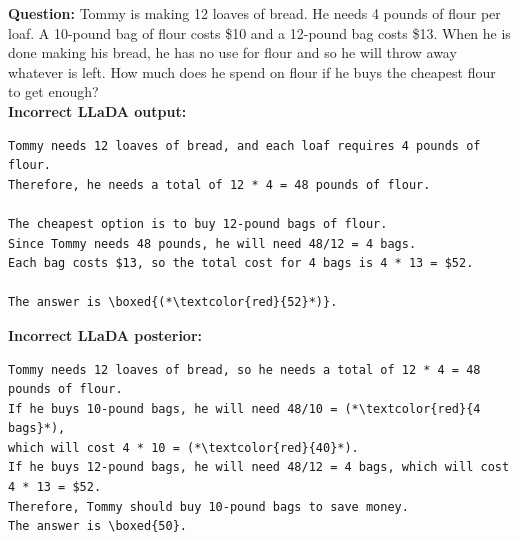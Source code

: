 \begin{examplebox}[Example 1]
\textbf{Question:} Tommy is making 12 loaves of bread. He needs 4 pounds of flour per loaf. A 10-pound bag of flour costs \$10 and a 12-pound bag costs \$13. When he is done making his bread, he has no use for flour and so he will throw away whatever is left. How much does he spend on flour if he buys the cheapest flour to get enough? \\[6pt]

\textbf{Incorrect LLaDA output:}
\begin{lstlisting}
Tommy needs 12 loaves of bread, and each loaf requires 4 pounds of flour. 
Therefore, he needs a total of 12 * 4 = 48 pounds of flour.

The cheapest option is to buy 12-pound bags of flour. 
Since Tommy needs 48 pounds, he will need 48/12 = 4 bags. 
Each bag costs $13, so the total cost for 4 bags is 4 * 13 = $52.

The answer is \boxed{(*\textcolor{red}{52}*)}.
\end{lstlisting}

\textbf{Incorrect LLaDA posterior:}
\begin{lstlisting}
Tommy needs 12 loaves of bread, so he needs a total of 12 * 4 = 48 pounds of flour.
If he buys 10-pound bags, he will need 48/10 = (*\textcolor{red}{4 bags}*), 
which will cost 4 * 10 = (*\textcolor{red}{40}*).
If he buys 12-pound bags, he will need 48/12 = 4 bags, which will cost 4 * 13 = $52.
Therefore, Tommy should buy 10-pound bags to save money.
The answer is \boxed{50}.
\end{lstlisting}
\end{examplebox}

